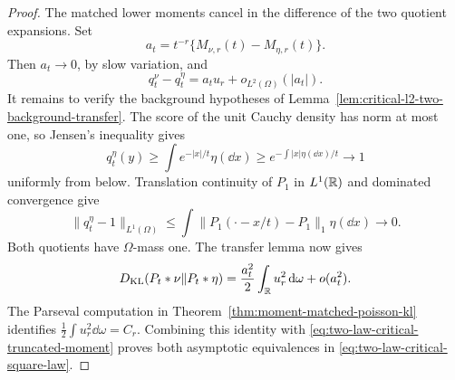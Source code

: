\begin{proof}
The matched lower moments cancel in the difference of the two quotient
expansions.  Set
\[
 a_t=t^{-r}\{M_{\nu,r}(t)-M_{\eta,r}(t)\}.
\]
Then \(a_t\to0\), by slow variation, and
\[
 q_t^\nu-q_t^\eta=a_tu_r+o_{L^2(\Omega)}(|a_t|).
\]
It remains to verify the background hypotheses of
Lemma~\ref{lem:critical-l2-two-background-transfer}.  The score of the unit
Cauchy density has norm at most one, so Jensen's inequality gives
\[
 q_t^\eta(y)\ge\int e^{-|x|/t}\eta(\dd x)
 \ge e^{-\int|x|\eta(\dd x)/t}\longrightarrow1
\]
uniformly from below.  Translation continuity of \(P_1\) in \(L^1(\mathbb{R})\)
and dominated convergence give
\[
 \|q_t^\eta-1\|_{L^1(\Omega)}
 \le\int\|P_1(\mathord\cdot-x/t)-P_1\|_1\eta(\dd x)
 \longrightarrow0.
\]
Both quotients have \(\Omega\)-mass one.  The transfer lemma now gives
\[
 D_{\rm KL}(P_t*\nu\|P_t*\eta)
 =\frac{a_t^2}{2}\int_{\mathbb{R}} u_r^2\,\mathrm{d}\omega+o(a_t^2).
\]
The Parseval computation in
Theorem~\ref{thm:moment-matched-poisson-kl} identifies
\(\frac12\int u_r^2\dd\omega=C_r\).  Combining this identity with
\eqref{eq:two-law-critical-truncated-moment} proves both asymptotic
equivalences in \eqref{eq:two-law-critical-square-law}.
\end{proof}
